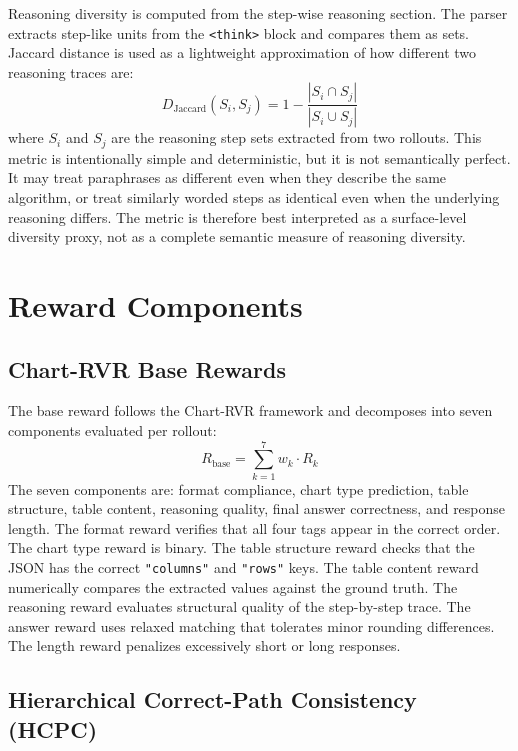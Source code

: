 \documentclass{iutbscthesis}
\begin{document}
Reasoning diversity is computed from the step-wise reasoning section. The parser extracts step-like units from the \texttt{<think>} block and compares them as sets. Jaccard distance is used as a lightweight approximation of how different two reasoning traces are:
\begin{equation}
    D_{\text{Jaccard}}(S_i, S_j) = 1 - \frac{|S_i \cap S_j|}{|S_i \cup S_j|}
\end{equation}
where $S_i$ and $S_j$ are the reasoning step sets extracted from two rollouts. This metric is intentionally simple and deterministic, but it is not semantically perfect. It may treat paraphrases as different even when they describe the same algorithm, or treat similarly worded steps as identical even when the underlying reasoning differs. The metric is therefore best interpreted as a surface-level diversity proxy, not as a complete semantic measure of reasoning diversity.

\section{Reward Components}

\subsection{Chart-RVR Base Rewards}

The base reward follows the Chart-RVR framework \cite{sinha2025chartrvr} and decomposes into seven components evaluated per rollout:
\begin{equation}
    R_{\text{base}} = \sum_{k=1}^{7} w_k \cdot R_k
\end{equation}
The seven components are: format compliance, chart type prediction, table structure, table content, reasoning quality, final answer correctness, and response length. The format reward verifies that all four tags appear in the correct order. The chart type reward is binary. The table structure reward checks that the JSON has the correct \texttt{"columns"} and \texttt{"rows"} keys. The table content reward numerically compares the extracted values against the ground truth. The reasoning reward evaluates structural quality of the step-by-step trace. The answer reward uses relaxed matching that tolerates minor rounding differences. The length reward penalizes excessively short or long responses.

\subsection{Hierarchical Correct-Path Consistency (HCPC)}
\end{document}
